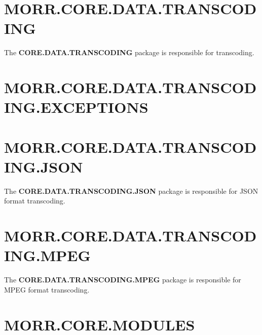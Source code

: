 \section*{MORR.CORE.DATA.TRANSCODING}

The \textbf{CORE.DATA.TRANSCODING} package is responsible for transcoding.

\begin{packif}
\end{packif}

\begin{packpack}
\end{packpack}

\section*{MORR.CORE.DATA.TRANSCODING.EXCEPTIONS}

\begin{packclass}
\end{packclass}

\section*{MORR.CORE.DATA.TRANSCODING.JSON}

The \textbf{CORE.DATA.TRANSCODING.JSON} package is responsible for JSON format transcoding.

\begin{packclass}
\end{packclass}

\section*{MORR.CORE.DATA.TRANSCODING.MPEG}

The \textbf{CORE.DATA.TRANSCODING.MPEG} package is responsible for MPEG format transcoding.

\begin{packclass}
\end{packclass}

\section*{MORR.CORE.MODULES}

